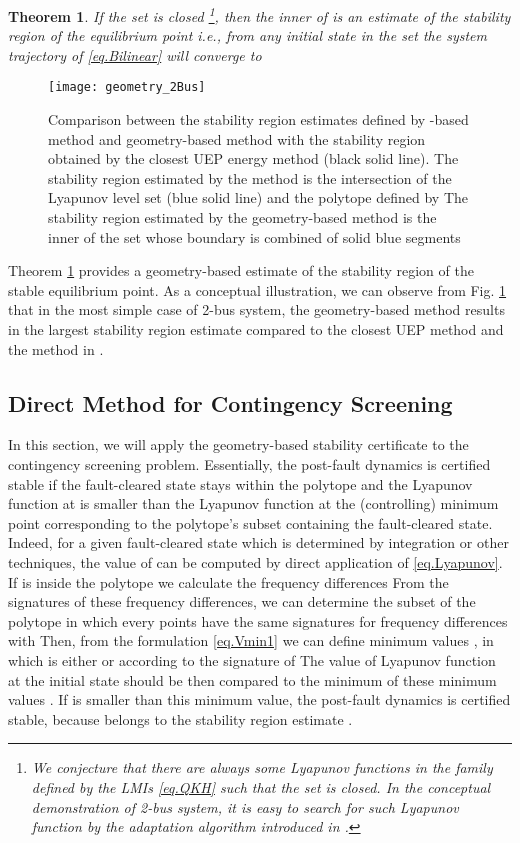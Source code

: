 \documentclass[final]{IEEEtran}
\newtheorem{theorem}{Theorem}\newtheorem{remark}{Remark}\newtheorem{lemma}{Lemma}\usepackage{color}
\begin{document}
\begin{theorem}
\label{thr.stabilityregion}
\emph{If the set  is closed \footnote{We conjecture that there are always some Lyapunov functions in the family defined by the LMIs \eqref{eq.QKH} such that the set
 is closed. In the conceptual demonstration of 2-bus system, it is easy to search for such Lyapunov function by the adaptation algorithm introduced in \cite{Vu:2014}.}, then the inner of  is an estimate of the stability region of the equilibrium point  i.e., 
from any initial state  in the set  the system trajectory  of \eqref{eq.Bilinear} will converge to  
}
\end{theorem}
\begin{figure}
\centering
\texttt{[image: geometry\_2Bus]}
\caption{Comparison between the stability region estimates defined by -based method and
geometry-based method with the stability region  obtained
by the closest UEP energy method (black solid line). The stability region estimated by the  method is the intersection of the Lyapunov level set (blue 
solid line) and the polytope defined by  The stability region estimated by the geometry-based method is the inner of the set whose boundary is combined of solid blue segments} \label{fig.comparison_2Bus}
\end{figure}


Theorem \ref{thr.stabilityregion} provides a geometry-based estimate of the stability region of the stable equilibrium point. As a conceptual illustration, we can observe from Fig. \ref{fig.comparison_2Bus} that in the most simple case of 2-bus system, the geometry-based method results in the largest stability region estimate compared to the closest UEP method and the  method in \cite{Vu:2014}.


\subsection{Direct Method for Contingency Screening}

\label{sec.screen} In this section, we will apply the geometry-based stability certificate to the contingency screening problem. Essentially, the post-fault dynamics is certified stable
if the fault-cleared state  stays within the polytope  and the Lyapunov function at  is smaller than the Lyapunov function at the (controlling) minimum point corresponding to the polytope's subset containing the fault-cleared state. Indeed, for a given fault-cleared state 
which is determined by integration or other techniques, the value of  can be computed by direct application of
\eqref{eq.Lyapunov}. If  is inside the polytope  we calculate the frequency differences  From the  signatures of these frequency differences,
we can determine the subset of the polytope  in which every points have the same signatures for frequency differences with  Then, from the formulation \eqref{eq.Vmin1} we can define 
minimum values , in which  is either  or  according to the signature of  
The value of Lyapunov function at the initial state  should be then compared to the minimum
of these 
minimum values . If  is smaller than this minimum value, the post-fault dynamics is certified stable, because  belongs to the stability region estimate .
\end{document}
